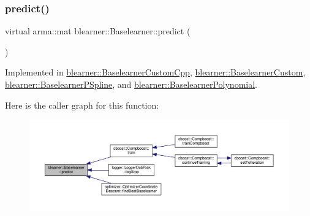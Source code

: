 \mbox{\label{classblearner_1_1_baselearner_ab37986047db43c84420fef2cef7fc20d}} 
\subsubsection{\texorpdfstring{predict()}{predict()}\hspace{0.1cm}{\footnotesize\ttfamily [1/2]}}
{\footnotesize\ttfamily virtual arma\+::mat blearner\+::\+Baselearner\+::predict (\begin{DoxyParamCaption}{ }\end{DoxyParamCaption})\hspace{0.3cm}{\ttfamily [pure virtual]}}



Implemented in \hyperlink{classblearner_1_1_baselearner_custom_cpp_a88c17ed1e32255e482f34695e06e7d25}{blearner\+::\+Baselearner\+Custom\+Cpp}, \hyperlink{classblearner_1_1_baselearner_custom_a7d9640dbb9a118b77735cf79a5850652}{blearner\+::\+Baselearner\+Custom}, \hyperlink{classblearner_1_1_baselearner_p_spline_a7d170166132a69ad0fb046e4599e0336}{blearner\+::\+Baselearner\+P\+Spline}, and \hyperlink{classblearner_1_1_baselearner_polynomial_ad45b97c416ac06755c617b671cfbdb76}{blearner\+::\+Baselearner\+Polynomial}.

Here is the caller graph for this function\+:
\nopagebreak
\begin{figure}[H]
\begin{center}
\leavevmode
\includegraphics[width=350pt]{classblearner_1_1_baselearner_ab37986047db43c84420fef2cef7fc20d_icgraph}
\end{center}
\end{figure}
\mbox{\label{classblearner_1_1_baselearner_ae2ef5e018783578e02b3b5a33fa94eae}} 
